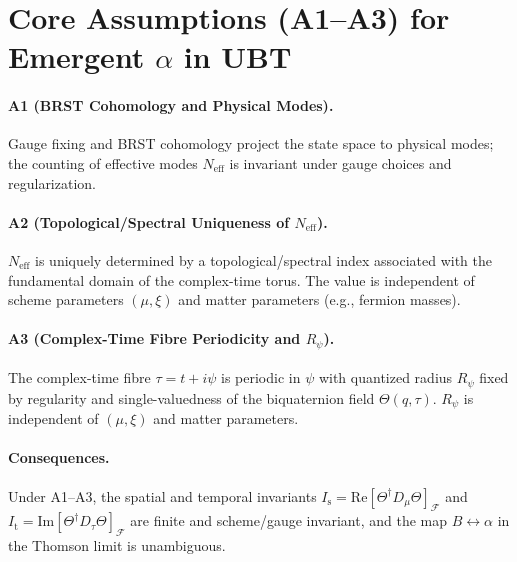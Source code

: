 
\section*{Core Assumptions (A1–A3) for Emergent $\alpha$ in UBT}

\paragraph{A1 (BRST Cohomology and Physical Modes).}
Gauge fixing and BRST cohomology project the state space to physical modes; the counting
of effective modes $N_{\mathrm{eff}}$ is invariant under gauge choices and regularization.

\paragraph{A2 (Topological/Spectral Uniqueness of $N_{\mathrm{eff}}$).}
$N_{\mathrm{eff}}$ is uniquely determined by a topological/spectral index associated with
the fundamental domain of the complex-time torus. The value is independent of scheme
parameters $(\mu,\xi)$ and matter parameters (e.g., fermion masses).

\paragraph{A3 (Complex-Time Fibre Periodicity and $R_\psi$).}
The complex-time fibre $\tau=t+i\psi$ is periodic in $\psi$ with quantized radius $R_\psi$
fixed by regularity and single-valuedness of the biquaternion field $\Theta(q,\tau)$.
$R_\psi$ is independent of $(\mu,\xi)$ and matter parameters.

\paragraph{Consequences.}
Under A1–A3, the spatial and temporal invariants
$I_{\mathrm s}=\mathrm{Re}[\Theta^\dagger D_\mu\Theta]_{\mathcal F}$ and
$I_{\mathrm t}=\mathrm{Im}[\Theta^\dagger D_\tau\Theta]_{\mathcal F}$ are finite and scheme/gauge invariant,
and the map $B\leftrightarrow \alpha$ in the Thomson limit is unambiguous.
